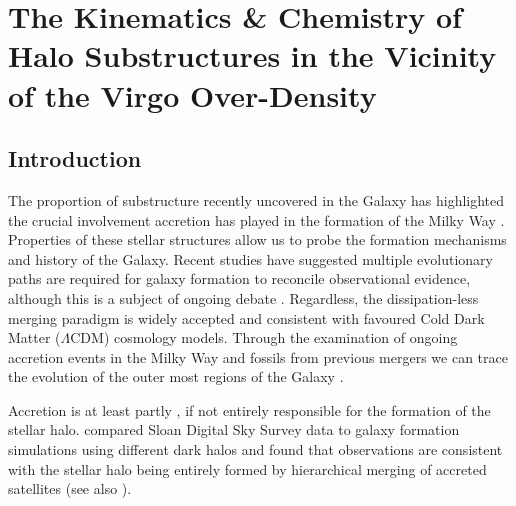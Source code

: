 \chapter{The Kinematics \& Chemistry of Halo Substructures in the Vicinity of the Virgo Over-Density}



\section{Introduction}
The proportion of substructure recently uncovered in the Galaxy has highlighted the crucial involvement accretion has played in the formation of the Milky Way \citep[see][and references therein]{Helmi_2008}. Properties of these stellar structures allow us to probe the formation mechanisms and history of the Galaxy. Recent studies \citep{Carollo;et-al_2007, Carollo;et-al_2010} have suggested multiple evolutionary paths are required for galaxy formation to reconcile observational evidence, although this is a subject of ongoing debate \citep{Schoenrich;et-al_2011}. Regardless, the dissipation-less merging paradigm is widely accepted and consistent with favoured Cold Dark Matter ($\Lambda$CDM) cosmology models. Through the examination of ongoing accretion events in the Milky Way and fossils from previous mergers we can trace the evolution of the outer most regions of the Galaxy \citep[e.g.,][]{Helmi;White_2001}.
	
 Accretion is at least partly \citep[e.g.,][]{Starkenburg;et-al_2009}, if not entirely responsible for the formation of the stellar halo. \citet{Bell;et-al_2008} compared Sloan Digital Sky Survey \citep[hereafter SDSS]{York;et-al_2000} data to galaxy formation simulations using different dark halos and found that observations are consistent with the stellar halo being entirely formed by hierarchical merging of accreted satellites (see also \citet{Xue;et-al_2011}).
	
